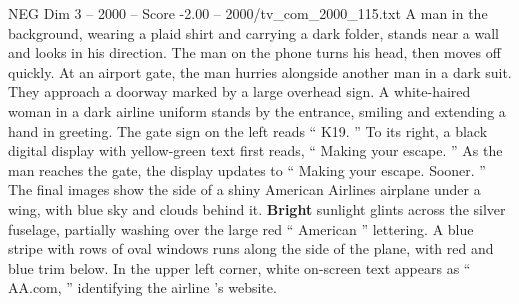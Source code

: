 \begin{textsample}{NEG Dim 3 – 2000 – Score -2.00 – 2000/tv\_com\_2000\_115.txt}
A man in the background, wearing a plaid shirt and carrying a dark folder, stands near a wall and looks in his direction.
The man on the phone turns his head, then moves off quickly.
At an airport gate, the man hurries alongside another man in a dark suit.
They approach a doorway marked by a large overhead sign.
A white-haired woman in a dark airline uniform stands by the entrance, smiling and extending a hand in greeting.
The gate sign on the left reads “ K19. ” To its right, a black digital display with yellow-green text first reads, “ Making your escape. ” As the man reaches the gate, the display updates to “ Making your escape.
Sooner. ” The final images show the side of a shiny American Airlines airplane under a wing, with blue sky and clouds behind it. \textbf{Bright} sunlight glints across the silver fuselage, partially washing over the large red “ American ” lettering.
A blue stripe with rows of oval windows runs along the side of the plane, with red and blue trim below.
In the upper left corner, white on-screen text appears as “ AA.com, ” identifying the airline ’s website.

\end{textsample}
